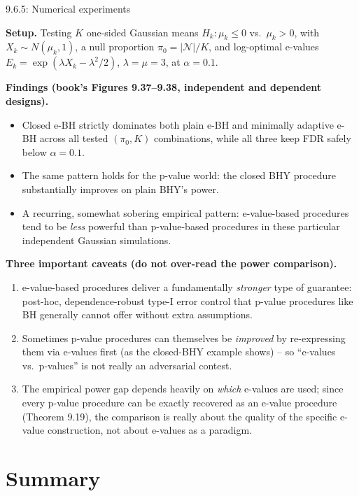 \documentclass[aspectratio=169,10pt]{beamer}
\newcommand{\Nc}{\mathcal{N}}
\begin{document}
\begin{frame}[allowframebreaks]{9.6.5: Numerical experiments}

\textbf{Setup.} Testing $K$ one-sided Gaussian means $H_k:\mu_k\le0$ vs.\ $\mu_k>0$, with $X_k\sim N(\mu_k,1)$, a null proportion $\pi_0=|\Nc|/K$, and log-optimal e-values $E_k=\exp(\lambda X_k-\lambda^2/2)$, $\lambda=\mu=3$, at $\alpha=0.1$.

\textbf{Findings (book's Figures 9.37--9.38, independent and dependent designs).}
\begin{itemize}
\item Closed e-BH strictly dominates both plain e-BH and minimally adaptive e-BH across all tested $(\pi_0, K)$ combinations, while all three keep FDR safely below $\alpha=0.1$.
\item The same pattern holds for the p-value world: the closed BHY procedure substantially improves on plain BHY's power.
\item A recurring, somewhat sobering empirical pattern: e-value-based procedures tend to be \emph{less} powerful than p-value-based procedures in these particular independent Gaussian simulations.
\end{itemize}

\textbf{Three important caveats (do not over-read the power comparison).}
\begin{enumerate}
\item e-value-based procedures deliver a fundamentally \emph{stronger} type of guarantee: post-hoc, dependence-robust type-I error control that p-value procedures like BH generally cannot offer without extra assumptions.
\item Sometimes p-value procedures can themselves be \emph{improved} by re-expressing them via e-values first (as the closed-BHY example shows) -- so ``e-values vs.\ p-values'' is not really an adversarial contest.
\item The empirical power gap depends heavily on \emph{which} e-values are used; since every p-value procedure can be exactly recovered as an e-value procedure (Theorem 9.19), the comparison is really about the quality of the specific e-value construction, not about e-values as a paradigm.
\end{enumerate}

\end{frame}

\section{Summary}
\end{document}
